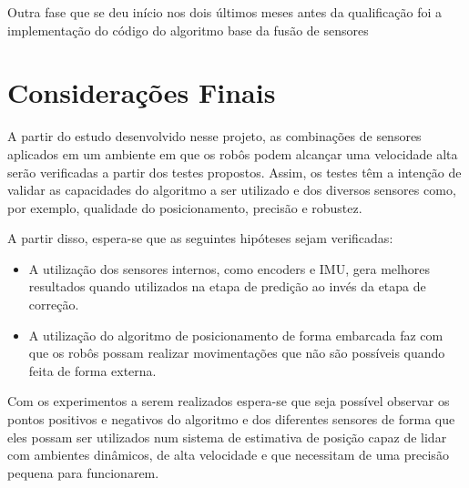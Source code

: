 \documentclass[acronym, symbols, table]{fei}
\begin{document}
			Outra fase que se deu início nos dois últimos meses antes da qualificação foi a implementação do código do algoritmo base da fusão de sensores
	
	\chapter{Considerações Finais}
	
		A partir do estudo desenvolvido nesse projeto, as combinações de sensores aplicados em um ambiente em que os robôs podem alcançar uma velocidade alta serão verificadas a partir dos testes propostos. Assim, os testes têm a intenção de validar as capacidades do algoritmo a ser utilizado e dos diversos sensores como, por exemplo, qualidade do posicionamento, precisão e robustez.
		
		A partir disso, espera-se que as seguintes hipóteses sejam verificadas:
		
		\begin{itemize}
			\item A utilização dos sensores internos, como encoders e IMU, gera melhores resultados quando utilizados na etapa de predição ao invés da etapa de correção.
			
			\item A utilização do algoritmo de posicionamento de forma embarcada faz com que os robôs possam realizar movimentações que não são possíveis quando feita de forma externa.
		\end{itemize}
		
		Com os experimentos a serem realizados espera-se que seja possível observar os pontos positivos e negativos do algoritmo e dos diferentes sensores de forma que eles possam ser utilizados num sistema de estimativa de posição capaz de lidar com ambientes dinâmicos, de alta velocidade e que necessitam de uma precisão pequena para funcionarem.
	
	\printbibliography
\end{document}
